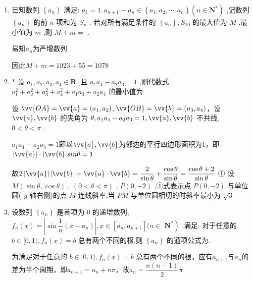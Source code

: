 \begin{enumerate}
\begin{jieda}
        易知三个人报数结束的尾数为1为首项，1为公差的等差数列的前$n$项和$S_n = \dfrac{n(n+1)}{2}$，36轮结束后$C$所报尾数为$S_{108} = 5886$，故目标数字为$5886+95 = 5981$
    \end{jieda}
    \item 已知数列 $\left\{  {a}_{n}\right\}$ 满足: ${a}_{1} = 1,{a}_{n + 1} - {a}_{n} \in  \left\{  {{a}_{1},{a}_{2},\cdots ,{a}_{n}}\right\}  \left( {n \in  {\mathbf{N}}^{ * }}\right)$ ,记数列 $\left\{  {a}_{n}\right\}$ 的前 $n$ 项和为 ${S}_{n}$ . 若对所有满足条件的 $\left\{  {a}_{n}\right\}  ,{S}_{10}$ 的最大值为 $M$ ,最小值为 $m$ ,则 $M + m =$ .
    \begin{jieda}
        易知$a_n$为严增数列
        因此$M + m = 1023 + 55 = 1078$
    \end{jieda}
    \item * 设 ${a}_{1},{a}_{2},{a}_{3},{a}_{4} \in  \mathbf{R}$ ,且 ${a}_{1}{a}_{4} - {a}_{2}{a}_{3} = 1$ ,则代数式 ${a}_{1}^{2} + {a}_{2}^{2} + {a}_{3}^{2} + {a}_{4}^{2} + {a}_{1}{a}_{3} + {a}_{2}{a}_{4}$ 的最小值为.
    \begin{jieda}
        设 $\vv{OA} = \vv{a} = \left( {{a}_{1},{a}_{2}}\right) ,\vv{OB} = \vv{b} = \left( {{a}_{3},{a}_{4}}\right)$，设 $\vv{a},\vv{b}$ 的夹角为 $\theta ,{a}_{1}{a}_{4} - {a}_{2}{a}_{3} = 1,\vv{a},\vv{b}$ 不共线, $0 < \theta  < \pi$ .
        
        ${a}_{1}{a}_{4} - {a}_{2}{a}_{3} = 1$即以$\vv{a}, \vv{b}$为邻边的平行四边形面积为1，即$|\vv{a}|\cdot|\vv{b}|sin\theta = 1$
        
        故$2\left| \vv{a}\right| |\vv{b}|  + \vv{a} \cdot  \vv{b} = \dfrac{2}{\sin \theta } + \dfrac{\cos \theta }{\sin \theta } = \dfrac{\cos \theta  + 2}{\sin \theta }$ ①
        设 $M\left( {\sin \theta ,\cos \theta }\right)$ , $\left( {0 < \theta  < \pi }\right)$ , $P\left( {0, - 2}\right)$ ,①式表示点 $P\left( {0, - 2}\right)$ 与单位圆( $y$ 轴右侧)的点 $M$ 连线斜率,当 ${PM}$ 与单位圆相切的时斜率最小为 $\sqrt{3}$
    \end{jieda}
    \item 设数列 $\left\{  {a}_{n}\right\}$ 是首项为 0 的递增数列, ${f}_{n}\left( x\right)  = \left| {\sin \dfrac{1}{n}\left( {x - {a}_{n}}\right) }\right| ,x \in  \left\lbrack  {{a}_{n},{a}_{n + 1}}\right\rbrack  (n \in$  $\left. {\mathbf{N}}^{ * }\right)$ ,满足: 对于任意的 $b \in  \lbrack 0,1),{f}_{n}\left( x\right)  = b$ 总有两个不同的根,则 $\left\{  {a}_{n}\right\}$ 的通项公式为.
    \begin{jieda}
        为满足对于任意的 $b \in  \lbrack 0,1),{f}_{n}\left( x\right)  = b$ 总有两个不同的根，应有$a_{n+1}$与$a_n$的差为半个周期，即$a_{n+1} = a_n + n\pi$，故$a_n = \dfrac{n(n-1)}{2}\pi$
    \end{jieda}
\end{enumerate} 

